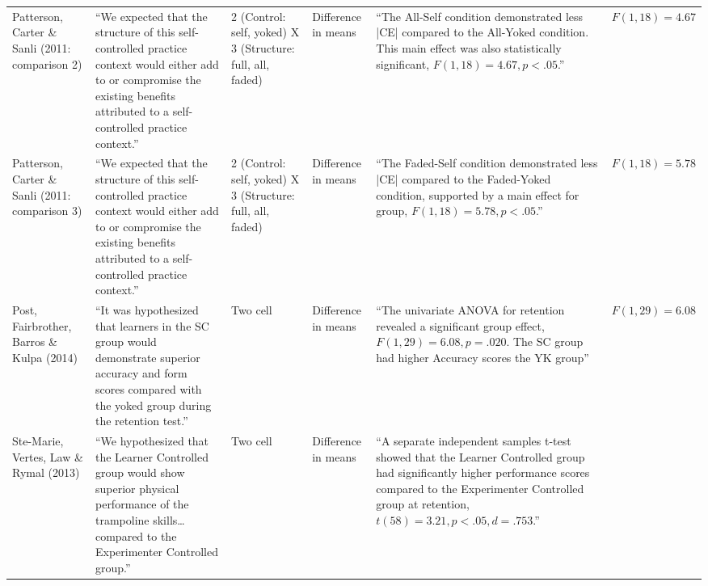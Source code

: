 \documentclass[man,floatsintext,hidelinks]{apa7}
\begin{document}
\begin{landscape}
\begin{longtable}[l]{p{2cm}p{5.5cm}p{3cm}p{2cm}p{6cm}p{1.5cm}}
   \\[3.5cm]
Patterson, Carter \& Sanli (2011: comparison 2) &
  ``We expected that the structure of this self-controlled practice context would either add to or compromise the existing benefits attributed to a self-controlled practice context.'' &
  2 (Control: self, yoked) X 3 (Structure: full, all, faded) &
  Difference in means &
  ``The All-Self condition demonstrated less |CE| compared to the All-Yoked condition. This main effect was also statistically significant, $F(1, 18) = 4.67, p < .05$.'' &
  $F(1, 18) = 4.67$
   \\[2.25cm]
Patterson, Carter \& Sanli (2011: comparison 3) &
  ``We expected that the structure of this self-controlled practice context would either add to or compromise the existing benefits attributed to a self-controlled practice context.'' &
  2 (Control: self, yoked) X 3 (Structure: full, all, faded) &
  Difference in means &
  ``The Faded-Self condition demonstrated less |CE| compared to the Faded-Yoked condition, supported by a main effect for group, $F(1, 18) = 5.78, p < .05$.'' &
  $F(1, 18) = 5.78$
   \\[2.25cm]
Post, Fairbrother, Barros \& Kulpa (2014) &
  ``It was hypothesized that learners in the SC group would demonstrate superior accuracy and form scores compared with the yoked group during the retention test.'' &
  Two cell &
  Difference in means &
  ``The univariate ANOVA for retention revealed a significant group effect, $F(1, 29) = 6.08, p = .020$. The SC group had higher Accuracy scores the YK group'' &
  $F(1, 29) = 6.08$
   \\[2.25cm]
Ste-Marie, Vertes, Law \& Rymal (2013) &
  ``We hypothesized that the Learner Controlled group would show superior physical performance of the trampoline skills… compared to the Experimenter Controlled group.'' &
  Two cell &
  Difference in means &
  ``A separate independent samples t-test showed that the Learner Controlled group had significantly higher performance scores compared to the Experimenter Controlled group at retention, $t(58) = 3.21, p < .05, d = .753$.'' &

\end{longtable}
\end{landscape}
\end{document}
